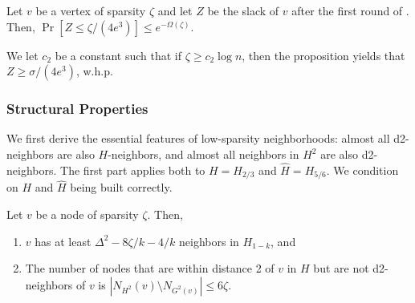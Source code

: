 \begin{proposition}[\cite{EPS15}, Lemma 3.1]
Let $v$ be a vertex of sparsity $\zeta$ and let $Z$ be the slack of $v$ after the first round of . Then, 
 $\Pr[Z \le \zeta/(4 e^3)] \le e^{-\Omega(\zeta)}$.
\label{P:sparsity}
\end{proposition}

We let $c_2$ be a constant such that if $\zeta \ge c_2\log n$, then the proposition yields that $Z \ge \sigma/(4e^3)$, w.h.p.

\subsubsection{Structural Properties} 

We first derive the essential features of low-sparsity neighborhoods: almost all d2-neighbors are also $H$-neighbors, and almost all neighbors in $H^2$ are also d2-neighbors.
The first part applies both to $H = H_{2/3}$ and $\hat{H} = H_{5/6}$. We condition on $H$ and $\hat{H}$ being built correctly.

\begin{lemma}
Let $v$ be a node of sparsity $\zeta$.
Then,
\begin{enumerate}
    \item $v$ has at least $\Delta^2 - 8\zeta/k -4/k$ neighbors in $H_{1-k}$, and
    \item The number of nodes that are within distance 2 of $v$ in $H$ but are not d2-neighbors of $v$ is
$|N_{H^2}(v) \setminus N_{G^2(v)}| \le 6\zeta$.
\end{enumerate}
\label{L:h-degree}
\end{lemma}
 
